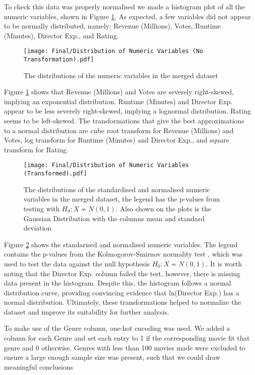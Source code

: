         To check this data was properly normalised we made a histogram plot of all the
            numeric variables, shown in Figure \ref{fig-distribution-of-numeric-variable}.
        As expected, a few variables did not appear to be normally distributed, namely:
        Revenue (Millions), Votes, Runtime (Minutes), Director Exp., and Rating.
        \begin{figure}[H]
            \centering
            \texttt{[image: Final/Distribution of Numeric Variables (No Transformation).pdf]}
            \caption[short]{The distributions of the numeric variables in the merged dataset}\label{fig-distribution-of-numeric-variable}
        \end{figure}
        Figure \ref*{fig-distribution-of-numeric-variable} shows that Revenue (Millions) and Votes are
        severely right-skewed, implying an exponential distribution. Runtime
        (Minutes) and Director Exp. appear to be less severely right-skewed,
        implying a lognormal distribution. Rating seems to be left-skewed. The
        transformations that give the best approximations to a normal
        distribution are cube root transform for Revenue (Millions) and Votes,
        log transform for Runtime (Minutes) and Director Exp., and square
        transform for Rating.
        \begin{figure}[H]
            \centering
            \texttt{[image: Final/Distribution of Numeric Variables (Transformed).pdf]}
            \caption[short]{The distributions of the standardised and normalised numeric variables in the merged dataset,
                            the legend has the p-values from testing with $H_{0}: X \not\sim N(0,1)$. Also shown on the plots is
                            the Gaussian Distribution with the columns mean and standard deviation}\label{fig-transformed-distribution-of-numeric-variable}
        \end{figure}
        Figure \ref*{fig-transformed-distribution-of-numeric-variable} shows the
        standarised and normalised numeric variables. The legend contains the p-values
        from the Kolmogorov-Smirnov normality test \cite*{KStest}, which was used to
        test the data against the null hypothesis $H_{0}: X \not\sim N(0,1)$. It is
        worth noting that the Director Exp. column failed the test, however, there is
        missing data present in the histogram. Despite this, the histogram follows a
        normal distribution curve, providing convincing evidence that ln(Director Exp.)
        has a normal distribution. Ultimately, these transformations helped to normalize
        the dataset and improve its suitability for further analysis.

        To make use of the Genre column, one-hot encoding was used.
        We added a column for each Genre and set each entry to 1 if the corresponding movie
            fit that genre and 0 otherwise.
        Genres with less than 100 movies made were excluded to ensure a large enough sample size
            was present, such that we could draw meaningful conclusions